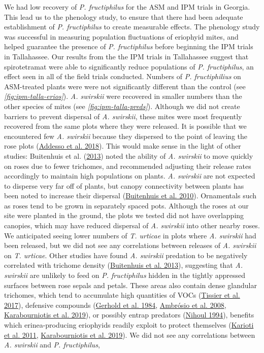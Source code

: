 \documentclass{ufdissertation}[overrideChapters] %
\begin{document}
{We had low recovery of \emph{P. fructiphilus} for the ASM and IPM trials in Georgia. This lead us to the phenology study, to ensure that there had been adequate establishment of \emph{P. fructiphilus} to create measurable effects. The phenology study was successful in measuring population fluctuations of eriophyid mites, and helped guarantee the presence of \emph{P. fructiphilus} before beginning the IPM trials in Tallahassee. Our results from the the IPM trials in Tallahassee suggest that spirotetramat were able to significantly reduce populations of \emph{P. fructiphilus}, an effect seen in all of the field trials conducted. Numbers of \emph{P. fructiphilius} on ASM-treated plants were were not significantly different than the control (see \emph{\ref{fig:ipm-talla-erios}}). \emph{A. swirskii} were recovered in smaller numbers than the other species of mites (see \emph{\ref{fig:ipm-talla-preds}}). Although we did not create barriers to prevent dispersal of \emph{A. swirskii}, these mites were most frequently recovered from the same plots where they were released. It is possible that we encountered few \emph{A. swirskii} because they dispersed to the point of leaving the rose plots (\protect\hyperlink{ref-Addesso2018}{Addesso et al. 2018}). This would make sense in the light of other studies: Buitenhuis et al. (\protect\hyperlink{ref-Buitenhuis2013}{2013}) noted the ability of \emph{A. swirskii} to move quickly on roses due to fewer trichomes, and recommended adjusting their release rates accordingly to maintain high populations on plants. \emph{A. swirskii} are not expected to disperse very far off of plants, but canopy connectivity between plants has been noted to increase their dispersal (\protect\hyperlink{ref-Buitenhuis2010}{Buitenhuis et al. 2010}). Ornamentals such as roses tend to be grown in separately spaced pots. Although the roses at our site were planted in the ground, the plots we tested did not have overlapping canopies, which may have reduced dispersal of \emph{A. swirskii} into other nearby roses. We anticipated seeing lower numbers of \emph{T. urticae} in plots where \emph{A. swirskii} had been released, but we did not see any correlations between releases of \emph{A. swirskii} on \emph{T. urticae}. Other studies have found \emph{A. swirskii} predation to be negatively correlated with trichome density (\protect\hyperlink{ref-Buitenhuis2013}{Buitenhuis et al. 2013}), suggesting that \emph{A. swirskii} are unlikely to feed on \emph{P. fructiphilus} hidden in the tightly appressed surfaces between rose sepals and petals. These areas also contain dense glandular trichomes, which tend to accumulate high quantities of VOCs (\protect\hyperlink{ref-Tissier2017}{Tissier et al. 2017}), defensive compounds (\protect\hyperlink{ref-Gerhold1984}{Gerhold et al. 1984}, \protect\hyperlink{ref-Ambrosio2008}{Ambrósio et al. 2008}, \protect\hyperlink{ref-Karabourniotis2019}{Karabourniotis et al. 2019}), or possibly entrap predators (\protect\hyperlink{ref-Nihoul1994}{Nihoul 1994}), benefits which erinea-producing eriophyids readily exploit to protect themselves (\protect\hyperlink{ref-Karioti2011}{Karioti et al. 2011}, \protect\hyperlink{ref-Karabourniotis2019}{Karabourniotis et al. 2019}). We did not see any correlations between \emph{A. swirskii} and \emph{P. fructiphilus}, }
\end{document}
